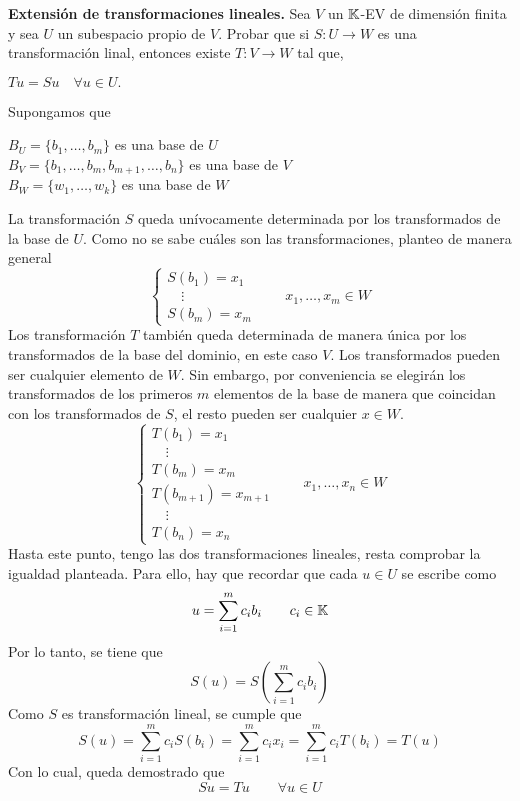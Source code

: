 \item \textbf{Extensión de transformaciones lineales.} Sea $V$ un $\mathbb{K}$-EV de dimensión finita y sea $U$ un subespacio propio de $V$. Probar que si $S:U\to W$ es una transformación linal, entonces existe $T:V\to W$ tal que,
    \begin{center}
        $Tu=Su\quad\forall u\in U.$        
    \end{center}
    \begin{mdframed}[style=s]
        Supongamos que
        \begin{center}
            $B_U=\{b_1,\dots,b_m\}$ es una base de $U$\\
            $B_V=\{b_1,\dots,b_m,b_{m+1},\dots,b_n\}$ es una base de $V$\\
            $B_W=\{w_1,\dots,w_k\}$ es una base de $W$
        \end{center}
        La transformación $S$ queda unívocamente determinada por los transformados de la base de $U$. Como no se sabe cuáles son las transformaciones, planteo de manera general\[\begin{cases}
            S(b_1)=x_1\\
            \quad\vdots\\
            S(b_m)=x_m
        \end{cases}\qquad x_1,\dots,x_m\in W\]
        Los transformación $T$ también queda determinada de manera única por los transformados de la base del dominio, en este caso $V$. Los transformados pueden ser cualquier elemento de $W$. Sin embargo, por conveniencia se elegirán los transformados de los primeros $m$ elementos de la base de manera que coincidan con los transformados de $S$, el resto pueden ser cualquier $x\in W$.\[\begin{cases}
            T(b_1)=x_1\\
            \quad\vdots\\
            T(b_m)=x_m\\
            T(b_{m+1})=x_{m+1}\\
            \quad\vdots\\
            T(b_n)=x_n
        \end{cases}\qquad x_1,\dots,x_n\in W\]
        Hasta este punto, tengo las dos transformaciones lineales, resta comprobar la igualdad planteada. Para ello, hay que recordar que cada $u\in U$ se escribe como \[u=\sum_{i=1}^mc_ib_i\qquad c_i\in\mathbb{K}\]
        Por lo tanto, se tiene que\[S(u)=S\left(\sum_{i=1}^mc_ib_i\right)\]
        Como $S$ es transformación lineal, se cumple que\[S(u)=\sum_{i=1}^mc_iS(b_i)=\sum_{i=1}^mc_ix_i=\sum_{i=1}^mc_iT(b_i)=T(u)\]
        Con lo cual, queda demostrado que\[Su=Tu\qquad\forall u\in U\]
    \end{mdframed}